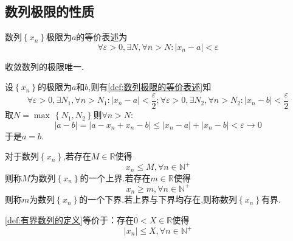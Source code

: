 \subsection{数列极限的性质}
\begin{formal}
    \begin{definition}[数列极限的等价表述]\label{def:数列极限的等价表述}
        数列$\left\{x_n\right\}$极限为$a$的等价表述为\[
        \forall \varepsilon>0,\exists N,\forall n>N:\left|x_n-a\right|<\varepsilon
        \]
    \end{definition}
\end{formal}
\begin{formal}
    \begin{theorem}[极限唯一]\label{thm:极限唯一}
        收敛数列的极限唯一.
    \end{theorem}
    \begin{Proof}
        设$\left\{x_n\right\}$的极限为$a$和$b$,则有\cref{def:数列极限的等价表述}知\[
        \forall \varepsilon>0,\exists N_1,\forall n>N_1:\left|x_n-a\right|<\frac{\varepsilon}{2};\forall \varepsilon>0,\exists N_2,\forall n>N_2:\left|x_n-b\right|<\frac{\varepsilon}{2}
        \]取$N=\max\,\left\{N_1,N_2\right\}$则$\forall n>N$:\[
        \left|a-b\right|=\left|
            a-x_n+x_n-b
        \right|\leqslant \left|
            x_n-a
        \right|+\left|
            x_n-b
        \right|<\varepsilon\to 0
        \]于是$a=b.$
    \end{Proof}
\end{formal}
\begin{formal}
    \begin{definition}[有界数列的定义]\label{def:有界数列的定义}
        对于数列$\left\{x_n\right\}$,若存在$M\in\mathbb{R}$使得\[
        x_n\leqslant M,\forall n\in\mathbb{N}^+
        \]则称$M$为数列$\left\{x_n\right\}$的一个上界.若存在$m\in\mathbb{R}$使得\[
        x_n\geqslant m,\forall n\in\mathbb{N}^+
        \]则称$m$为数列$\left\{x_n\right\}$的一个下界.若上界与下界均存在,则称数列$\left\{x_n\right\}$有界.
    \end{definition}
\end{formal}
\begin{formal}
    \begin{definition}[有界数列的等价定义]\label{def:有界数列的等价定义}
        \cref{def:有界数列的定义}等价于：存在$0<X\in\mathbb{R}$使得\[
        \left|x_n\right|\leqslant X,\forall n\in\mathbb{N}^+
        \]
    \end{definition}
\end{formal}
